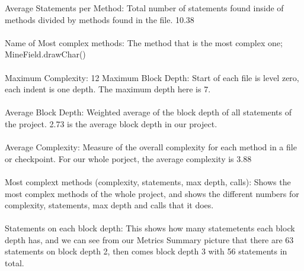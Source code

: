 \documentclass[UKenglish]{article}  %
\begin{document}
Average Statements per Method: Total number of statements found inside of methods divided by methods found in the file. 10.38 \\\\ 
Name of Most complex methods: The method that is the most complex one; MineField.drawChar()\\\\
Maximum Complexity: 12
Maximum Block Depth: Start of each file is level zero, each indent is one depth. The maximum depth here is 7. \\\\
Average Block Depth: Weighted average of the block depth of all statements of the project. 2.73 is the average block depth in our project. \\\\
Average Complexity: Measure of the overall complexity for each method in a file or checkpoint. For our whole porject, the average complexity is 3.88\\\\
Most complext methods (complexity, statements, max depth, calls): Shows the most complex methods of the whole project, and shows the different numbers for complexity, statements, max depth and calls that it does. \\\\
Statements on each block depth: This shows how many statemetents each block depth has, and we can see from our Metrics Summary picture that there are 63 statements on block depth 2, then comes block depth 3 with 56 statements in total. \\\\
\end{document}
